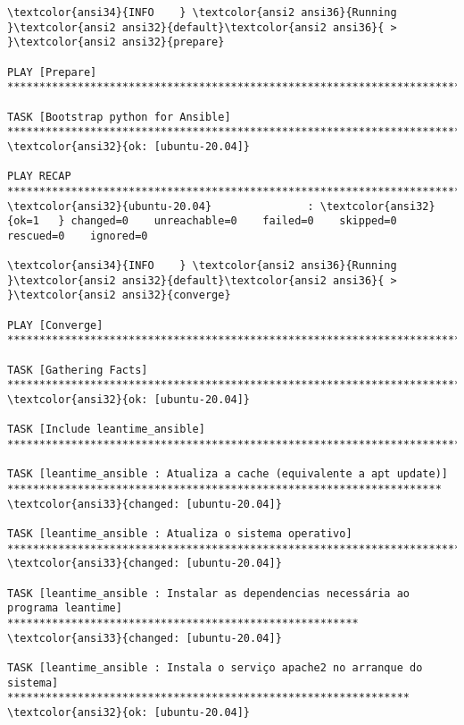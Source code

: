 \documentclass{scrartcl}
\begin{document}
\begin{Verbatim}
\textcolor{ansi34}{INFO    } \textcolor{ansi2 ansi36}{Running }\textcolor{ansi2 ansi32}{default}\textcolor{ansi2 ansi36}{ > }\textcolor{ansi2 ansi32}{prepare}

PLAY [Prepare] ***************************************************************************************************************************

TASK [Bootstrap python for Ansible] ******************************************************************************************************
\textcolor{ansi32}{ok: [ubuntu-20.04]}

PLAY RECAP *******************************************************************************************************************************
\textcolor{ansi32}{ubuntu-20.04}               : \textcolor{ansi32}{ok=1   } changed=0    unreachable=0    failed=0    skipped=0    rescued=0    ignored=0

\textcolor{ansi34}{INFO    } \textcolor{ansi2 ansi36}{Running }\textcolor{ansi2 ansi32}{default}\textcolor{ansi2 ansi36}{ > }\textcolor{ansi2 ansi32}{converge}

PLAY [Converge] **************************************************************************************************************************

TASK [Gathering Facts] *******************************************************************************************************************
\textcolor{ansi32}{ok: [ubuntu-20.04]}

TASK [Include leantime_ansible] **********************************************************************************************************

TASK [leantime_ansible : Atualiza a cache (equivalente a apt update)] ********************************************************************
\textcolor{ansi33}{changed: [ubuntu-20.04]}

TASK [leantime_ansible : Atualiza o sistema operativo] ***********************************************************************************
\textcolor{ansi33}{changed: [ubuntu-20.04]}

TASK [leantime_ansible : Instalar as dependencias necessária ao programa leantime] *******************************************************
\textcolor{ansi33}{changed: [ubuntu-20.04]}

TASK [leantime_ansible : Instala o serviço apache2 no arranque do sistema] ***************************************************************
\textcolor{ansi32}{ok: [ubuntu-20.04]}


\end{Verbatim}
\end{document}
